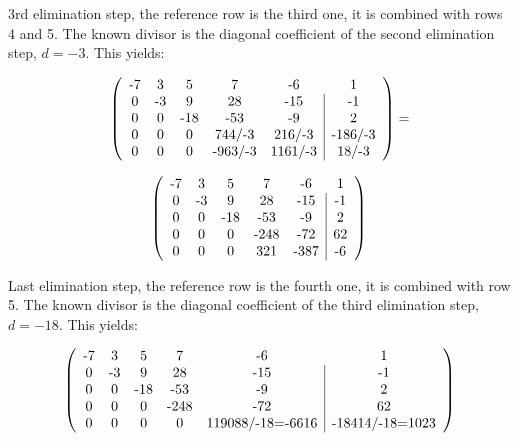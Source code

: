 \noindent
3rd elimination step, the reference row is the third one, it is combined
with rows 4 and 5. The known divisor is the diagonal coefficient of the
second elimination step, $d=-3$. This yields:

\begin{displaymath}
\left(
\begin{array}{ccccc|c}
$-7$ &  $3$ &   $5$ &    $7$    &   $-6$    &    $1$    \\
 $0$ & $-3$ &   $9$ &   $28$    &  $-15$    &   $-1$    \\
 $0$ &  $0$ & $-18$ &  $-53$    &   $-9$    &    $2$    \\
 $0$ &  $0$ &   $0$ &  $744/-3$ &  $216/-3$ & $-186/-3$ \\
 $0$ &  $0$ &   $0$ & $-963/-3$ & $1161/-3$ &   $18/-3$
\end{array}
\right) =
\end{displaymath}

\begin{displaymath}
\left(
\begin{array}{ccccc|c}
$-7$ &  $3$ &   $5$ &    $7$ &   $-6$ &  $1$ \\
 $0$ & $-3$ &   $9$ &   $28$ &  $-15$ & $-1$ \\
 $0$ &  $0$ & $-18$ &  $-53$ &   $-9$ &  $2$ \\
 $0$ &  $0$ &   $0$ & $-248$ &  $-72$ & $62$ \\
 $0$ &  $0$ &   $0$ &  $321$ & $-387$ & $-6$
\end{array}
\right) \\
\end{displaymath}

\noindent
Last elimination step, the reference row is the fourth one, it is combined
with row 5. The known divisor is the diagonal coefficient of the
third elimination step, $d=-18$. This yields:

\begin{displaymath}
\left(
\begin{array}{ccccc|c}
$-7$ &  $3$ &   $5$ &    $7$ &      $-6$            &       $1$           \\
 $0$ & $-3$ &   $9$ &   $28$ &     $-15$            &      $-1$           \\
 $0$ &  $0$ & $-18$ &  $-53$ &      $-9$            &       $2$           \\
 $0$ &  $0$ &   $0$ & $-248$ &     $-72$            &      $62$           \\
 $0$ &  $0$ &   $0$ &    $0$ & $119088/-18=-6616$ & $-18414/-18=1023$
\end{array}
\right)
\end{displaymath}

